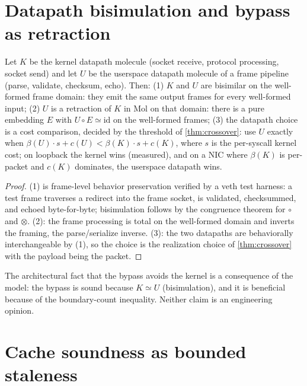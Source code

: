 \section{Datapath bisimulation and bypass as retraction}\label{sec:bypass}

\begin{theorem}\label{thm:60}\label{thm:bypass}
Let $K$ be the kernel datapath molecule (socket receive, protocol
processing, socket send) and let $U$ be the userspace datapath
molecule of a frame pipeline (parse, validate, checksum, echo). Then:
(1) $K$ and $U$ are bisimilar on the well-formed frame domain: they
emit the same output frames for every well-formed input;
(2) $U$ is a retraction of $K$ in Mol on that domain: there is a pure
embedding $E$ with $U \circ E \simeq \mathrm{id}$ on the well-formed
frames;
(3) the datapath choice is a cost comparison, decided by the threshold
of \autoref{thm:crossover}: use $U$ exactly when
$\beta (U) \cdot s + c (U) < \beta (K) \cdot s + c (K)$, where $s$ is the
per-syscall kernel cost; on loopback the kernel wins (measured), and on
a NIC where $\beta (K)$ is per-packet and $c (K)$ dominates, the
userspace datapath wins.
\end{theorem}

\begin{proof}
(1) is frame-level behavior preservation verified by a veth test
harness: a test frame traverses a redirect into the frame socket, is
validated, checksummed, and echoed byte-for-byte; bisimulation follows
by the congruence theorem for $\circ$ and $\otimes$. (2): the frame
processing is total on the well-formed domain and inverts the framing,
the parse/serialize inverse. (3): the two datapaths are behaviorally
interchangeable by (1), so the choice is the realization choice of
\autoref{thm:crossover} with the payload being the packet.
\end{proof}

\begin{remark}
The architectural fact that the bypass avoids the kernel is a
consequence of the model: the bypass is sound because $K \simeq U$
(bisimulation), and it is beneficial because of the boundary-count
inequality. Neither claim is an engineering opinion.
\end{remark}

\section{Cache soundness as bounded staleness}\label{sec:cache}

